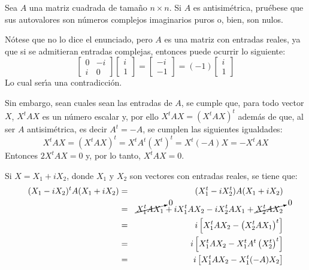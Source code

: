 \begin{enunciado}
 Sea $A$ una matriz cuadrada de tama\~no $n\times n$.
 Si $A$ es antisim\'etrica, pru\'ebese que sus autovalores son n\'umeros complejos imaginarios puros o, bien, son nulos.
\end{enunciado}
 
\begin{solucion}
 N\'otese que no lo dice el enunciado, pero $A$ es una matriz con entradas reales, ya que si se admitieran entradas complejas, entonces puede ocurrir lo siguiente:
 \begin{equation*}
  \begin{bmatrix}
   0 & -i \\
   i &  0
  \end{bmatrix}
  \begin{bmatrix}
   i \\ 1
  \end{bmatrix}
  =
  \begin{bmatrix}
   -i \\ -1
  \end{bmatrix}
  =
  (-1)
  \begin{bmatrix}
   i \\ 1
  \end{bmatrix}
 \end{equation*}
 Lo cual ser\'{\i}a una contradicci\'on.
 \par 
 Sin embargo, sean cuales sean las entradas de $A$, se cumple que, para todo vector $X$, $X^tAX$ es un n\'umero escalar y, por ello $X^tAX = \left( X^tAX \right)^t$ adem\'as de que, al ser $A$ antisim\'etrica, es decir $A^t = -A$, se cumplen las siguientes igualdades:
 \begin{equation*}
  X^tAX = \left( X^tAX \right)^t = X^tA^t(X^t)^t = X^t (-A)X = -X^tAX
 \end{equation*}
 Entonces $2X^tAX = 0$ y, por lo tanto, $X^tAX = 0$.
 \par 
 Si $X = X_1 + iX_2$, donde $X_1$ y $X_2$ son vectores con entradas reales, se tiene que:
 \begin{eqnarray*}
  (X_1 - iX_2)^tA(X_1 + iX_2) 
  & = & (X_1^t-iX_2^t)A(X_1+iX_2)\\
  & = & \cancelto{0}{X_1^tAX_1} + iX_1^tAX_2 - iX_2^tAX_1 + \cancelto{0}{X_2^tAX_2} \\
  & = & i\left[ X_1^tAX_2 - \left( X_2^tAX_1 \right)^t \right] \\
  & = & i\left[ X_1^tAX_2 - X_1^tA^t\left( X_2^t \right)^t \right] \\
  & = & i\left[ X_1^tAX_2 - X_1^t(-A)X_2 \right] \\

\end{eqnarray*}
\end{solucion}
